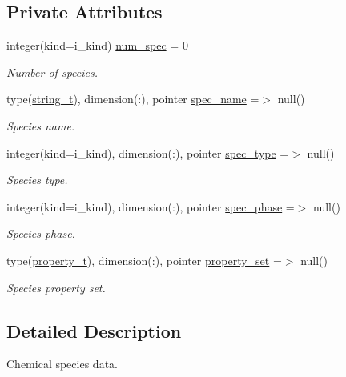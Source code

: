 \subsection*{Private Attributes}
\begin{DoxyCompactItemize}
\item 
integer(kind=i\+\_\+kind) \mbox{\hyperlink{structpmc__chem__spec__data_1_1chem__spec__data__t_ac04758f9b8613d5bab6651bff6677991}{num\+\_\+spec}} = 0
\begin{DoxyCompactList}\small\item\em Number of species. \end{DoxyCompactList}\item 
type(\mbox{\hyperlink{structpmc__util_1_1string__t}{string\+\_\+t}}), dimension(\+:), pointer \mbox{\hyperlink{structpmc__chem__spec__data_1_1chem__spec__data__t_a7906c514431eca9e46b20e14ba2f3b12}{spec\+\_\+name}} =$>$ null()
\begin{DoxyCompactList}\small\item\em Species name. \end{DoxyCompactList}\item 
integer(kind=i\+\_\+kind), dimension(\+:), pointer \mbox{\hyperlink{structpmc__chem__spec__data_1_1chem__spec__data__t_a9af0469b68b5ea93042b4e397360021f}{spec\+\_\+type}} =$>$ null()
\begin{DoxyCompactList}\small\item\em Species type. \end{DoxyCompactList}\item 
integer(kind=i\+\_\+kind), dimension(\+:), pointer \mbox{\hyperlink{structpmc__chem__spec__data_1_1chem__spec__data__t_a6aa1c219f847bc11c5794b5c6438233a}{spec\+\_\+phase}} =$>$ null()
\begin{DoxyCompactList}\small\item\em Species phase. \end{DoxyCompactList}\item 
type(\mbox{\hyperlink{structpmc__property_1_1property__t}{property\+\_\+t}}), dimension(\+:), pointer \mbox{\hyperlink{structpmc__chem__spec__data_1_1chem__spec__data__t_a46aefac03209ea59cd2068f653f361b9}{property\+\_\+set}} =$>$ null()
\begin{DoxyCompactList}\small\item\em Species property set. \end{DoxyCompactList}\end{DoxyCompactItemize}


\subsection{Detailed Description}
Chemical species data. 

